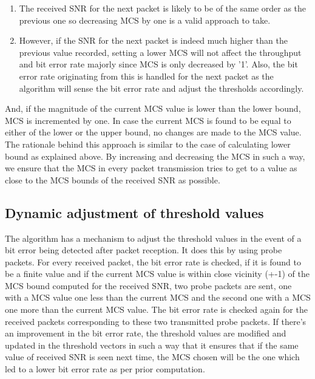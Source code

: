 \documentclass[a4paper, 10pt, conference]{ieeeconf}
\begin{document}
\begin{enumerate}
    \item The received SNR for the next packet is likely to be of the same order as the previous one so decreasing MCS by one is a valid approach to take.
    \item However, if the SNR for the next packet is indeed much higher than the previous value recorded, setting a lower MCS will not affect the throughput and bit error rate majorly since MCS is only decreased by '1'. Also, the bit error rate originating from this is handled for the next packet as the algorithm will sense the bit error rate and adjust the thresholds accordingly.
\end{enumerate}

And, if the magnitude of the current MCS value is lower than the lower bound, MCS is incremented by one. In case the current MCS is found to be equal to either of the lower or the upper bound, no changes are made to the MCS value. The rationale behind this approach is similar to the case of calculating lower bound as explained above.
By increasing and decreasing the MCS in such a way, we ensure that the MCS in every packet transmission tries to get to a value as close to the MCS bounds of the received SNR as possible.

\subsection{Dynamic adjustment of threshold values}

The algorithm has a mechanism to adjust the threshold values in the event of a bit error being detected after packet reception. It does this by using probe packets. For every received packet, the bit error rate is checked, if it is found to be a finite value and if the current MCS value is within close vicinity (+-1) of the MCS bound computed for the received SNR, two probe packets are sent, one with a MCS value one less than the current MCS and the second one with a MCS one more than the current MCS value. The bit error rate is checked again for the received packets corresponding to these two transmitted probe packets. If there's an improvement in the bit error rate, the threshold values are modified and updated in the threshold vectors in such a way that it ensures that if the same value of received SNR is seen next time, the MCS chosen will be the one which led to a lower bit error rate as per prior computation. 
\end{document}
